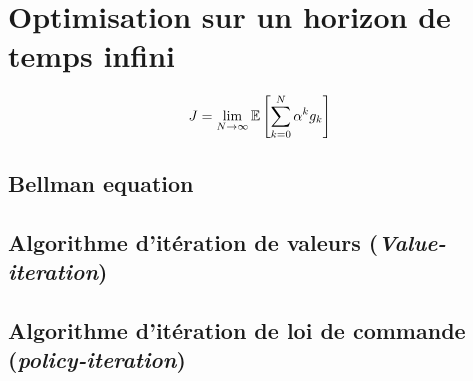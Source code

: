 \newpage
\section{Optimisation sur un horizon de temps infini}

\begin{align}
    J = 
    \lim_{N\rightarrow \infty}
    {\mathbb E}\left[  \sum_{k=0}^{N} 
    \alpha^k
    g_k
     \right]
\end{align}

\subsection{Bellman equation}


\subsection{Algorithme d'itération de valeurs (\textit{Value-iteration})}

\subsection{Algorithme d'itération de loi de commande (\textit{policy-iteration})}